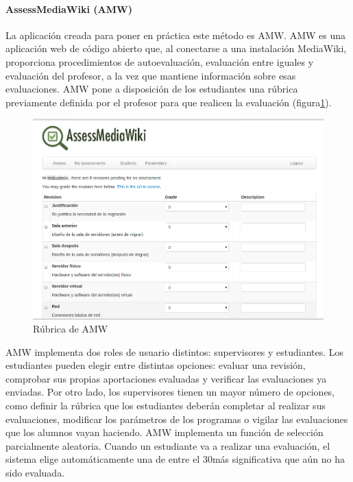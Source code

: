 \paragraph{AssessMediaWiki (AMW)}

La aplicación creada para poner en práctica este método es AMW. AMW es una aplicación web de código abierto que, al conectarse a una instalación MediaWiki, proporciona procedimientos de autoevaluación, evaluación entre iguales y evaluación del profesor, a la vez que mantiene información sobre esas evaluaciones. AMW pone a disposición de los estudiantes una rúbrica previamente definida por el profesor para que realicen la evaluación (figura\ref{fig:AmwRubrica}). 

\begin{figure}
  \begin{center}
    \includegraphics[scale=0.3]{AmwRubrica.png}
  \end{center}
  \caption{Rúbrica de AMW}
  \label{fig:AmwRubrica}
\end{figure}

AMW implementa dos roles de usuario distintos: supervisores y estudiantes. Los estudiantes pueden elegir entre distintas opciones: evaluar una revisión, comprobar sus propias aportaciones evaluadas y verificar las evaluaciones ya enviadas. Por otro lado, los supervisores tienen un mayor número de opciones, como definir la rúbrica que los estudiantes deberán completar al realizar sus evaluaciones, modificar los parámetros de los programas o vigilar las evaluaciones que los alumnos vayan haciendo. AMW implementa un función de selección parcialmente aleatoria. Cuando un estudiante va a realizar una evaluación, el sistema elige automáticamente una de entre el 30\percentage más significativa que aún no ha sido evaluada.

